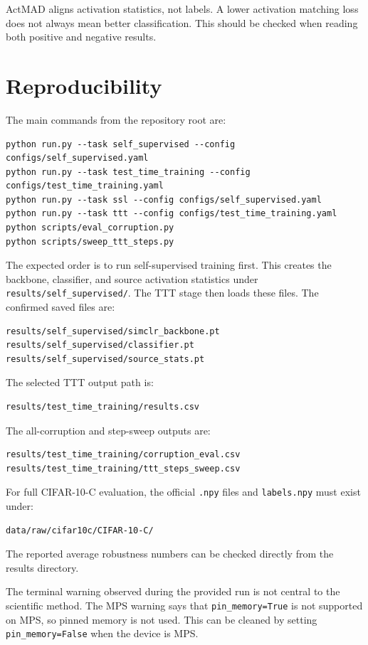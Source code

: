 \documentclass[a4paper,11pt]{article}
\begin{document}
ActMAD aligns activation statistics, not labels. A lower activation matching loss does not always mean better classification. This should be checked when reading both positive and negative results.

\section{Reproducibility}

The main commands from the repository root are:
\begin{lstlisting}
python run.py --task self_supervised --config configs/self_supervised.yaml
python run.py --task test_time_training --config configs/test_time_training.yaml
python run.py --task ssl --config configs/self_supervised.yaml
python run.py --task ttt --config configs/test_time_training.yaml
python scripts/eval_corruption.py
python scripts/sweep_ttt_steps.py
\end{lstlisting}

The expected order is to run self-supervised training first. This creates the backbone, classifier, and source activation statistics under \texttt{results/self\_supervised/}. The TTT stage then loads these files. The confirmed saved files are:
\begin{lstlisting}
results/self_supervised/simclr_backbone.pt
results/self_supervised/classifier.pt
results/self_supervised/source_stats.pt
\end{lstlisting}

The selected TTT output path is:
\begin{lstlisting}
results/test_time_training/results.csv
\end{lstlisting}
The all-corruption and step-sweep outputs are:
\begin{lstlisting}
results/test_time_training/corruption_eval.csv
results/test_time_training/ttt_steps_sweep.csv
\end{lstlisting}

For full CIFAR-10-C evaluation, the official \texttt{.npy} files and \texttt{labels.npy} must exist under:
\begin{lstlisting}
data/raw/cifar10c/CIFAR-10-C/
\end{lstlisting}
The reported average robustness numbers can be checked directly from the results directory.

The terminal warning observed during the provided run is not central to the scientific method. The MPS warning says that \texttt{pin\_memory=True} is not supported on MPS, so pinned memory is not used. This can be cleaned by setting \texttt{pin\_memory=False} when the device is MPS.
\end{document}
